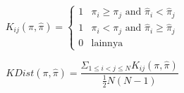 \begin{equation}
	K_{ij}(\pi, \hat{\pi}) = 
	\begin{cases}
		1 & \pi_i \geq \pi_j \text{ and } \hat{\pi}_i < \hat{\pi}_j \\
		1 & \pi_i < \pi_j \text{ and } \hat{\pi}_i \geq \hat{\pi}_j \\
		0 & \text{lainnya}
	\end{cases}
\end{equation}

\begin{equation}
	\label{eq:kendall_distance}
	KDist(\pi, \hat{\pi}) = \frac{\Sigma_{1 \leq i < j \leq N} K_{ij}(\pi, \hat{\pi})}{\frac{1}{2} N(N-1)}
\end{equation}